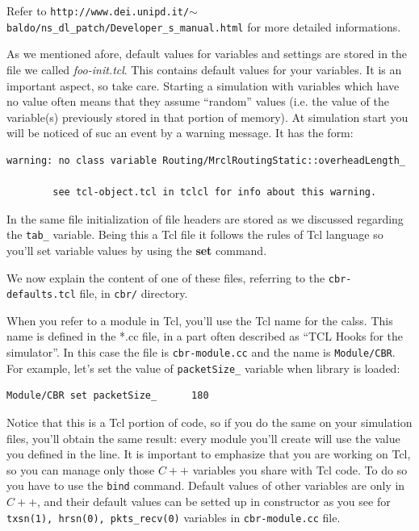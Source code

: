 \documentclass[a4paper,10pt]{article}
\begin{document}
Refer to \texttt{http://www.dei.unipd.it/$\sim$baldo/ns\_dl\_patch/Developer\_s\_manual.html} for more detailed informations.

As we mentioned afore, default values for variables and settings are stored in the file we called \emph{foo-init.tcl}. This contains default values for your variables. It is an important aspect, so take care. Starting a simulation with variables which have no value often means that they assume ``random'' values (i.e. the value of the variable(s) previously stored in that portion of memory). At simulation start you will be noticed of suc an event by a warning message. It has the form:
\begin{verbatim}
warning: no class variable Routing/MrclRoutingStatic::overheadLength_

        see tcl-object.tcl in tclcl for info about this warning.

\end{verbatim}

In the same file initialization of file headers are stored as we discussed regarding the \verb=tab_= variable. Being this a Tcl file it follows the rules of Tcl language so you'll set variable values by using the \textbf{set} command.

We now explain the content of one of these files, referring to the \verb=cbr-defaults.tcl= file, in \verb=cbr/= directory.

When you refer to a module in Tcl, you'll use the Tcl name for the calss. This name is defined in the *.cc file, in a part often described as ``TCL Hooks for the simulator''. In this case the file is \verb=cbr-module.cc= and the name is \verb=Module/CBR=. For example, let's set the value of \verb=packetSize_= variable when library is loaded:

\begin{verbatim}
Module/CBR set packetSize_      180
\end{verbatim}

Notice that this is a Tcl portion of code, so if you do the same on your simulation files, you'll obtain the same result: every module you'll create will use the value you defined in the line. It is important to emphasize that you are working on Tcl, so you can manage only those $C++$ variables you share with Tcl code. To do so you have to use the \verb=bind= command. Default values of other variables are only in $C++$, and their default values can be setted up in constructor as you see for \verb=txsn(1), hrsn(0), pkts_recv(0)= variables in \verb=cbr-module.cc= file.
\end{document}
